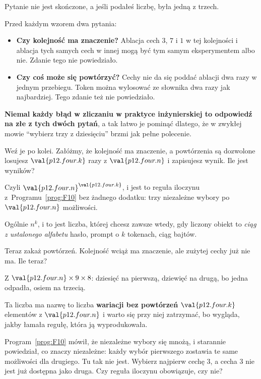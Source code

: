 \begin{fr}
\begin{ansblock}
Pytanie nie jest skończone, a jeśli podałeś liczbę, była jedną z trzech.
\end{ansblock}

Przed każdym wzorem dwa pytania:

\begin{itemize}
\item \textbf{Czy kolejność ma znaczenie?} Ablacja cech $3$, $7$ i $1$ w tej
  kolejności i ablacja tych samych cech w innej mogą być tym samym
  eksperymentem albo nie. Zdanie tego nie powiedziało.
\item \textbf{Czy coś może się powtórzyć?} Cechy nie da się poddać ablacji dwa
  razy w jednym przebiegu. Token można wylosować ze słownika dwa razy jak
  najbardziej. Tego zdanie też nie powiedziało.
\end{itemize}

\textbf{Niemal każdy błąd w zliczaniu w praktyce inżynierskiej to odpowiedź na
złe z tych dwóch pytań}, a tak łatwo je pominąć dlatego, że w zwykłej mowie
\enquote{wybierz trzy z dziesięciu} brzmi jak pełne polecenie.

Weź je po kolei. Załóżmy, że kolejność ma znaczenie, a powtórzenia są
dozwolone \dash{} losujesz $\val{p12.four.k}$ razy z
$\val{p12.four.n}$ i zapisujesz wynik. Ile jest wyników?
\nextframe
\end{fr}

\begin{fr}
Czyli $\val{p12.four.n}^{\val{p12.four.k}}$, i jest to reguła iloczynu
z~Programu~\ref{prog:F10} bez żadnego dodatku: trzy niezależne wybory po
$\val{p12.four.n}$ możliwości.

Ogólnie \textbf{$n^{k}$}, i to jest liczba, której chcesz zawsze wtedy, gdy
liczony obiekt to \emph{ciąg z ustalonego alfabetu} \dash{} hasło, prompt o
$k$ tokenach, ciąg bajtów.

Teraz zakaż powtórzeń. Kolejność wciąż ma znaczenie, ale zużytej cechy już
nie ma. Ile teraz?
\dotline
\nextframe
\end{fr}

\begin{fr}
Z $\val{p12.four.n} \times 9 \times 8$: dziesięć na pierwszą, dziewięć na
drugą, bo jedna odpadła, osiem na trzecią.

Ta liczba ma nazwę \dash{} to liczba \textbf{wariacji bez powtórzeń}
$\val{p12.four.k}$ elementów z $\val{p12.four.n}$ \dash{} i warto się przy
niej zatrzymać, bo wygląda, jakby łamała regułę, która ją wyprodukowała.

Program~\ref{prog:F10} mówił, że niezależne wybory się mnożą, i starannie
powiedział, co znaczy niezależne: każdy wybór pierwszego zostawia te same
możliwości dla drugiego. Tu tak nie jest. Wybierz najpierw cechę $3$, a cecha
$3$ nie jest już dostępna jako druga. Czy reguła iloczynu obowiązuje, czy nie?
\nextframe
\end{fr}

